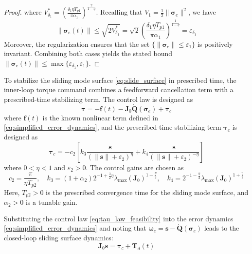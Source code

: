 \documentclass[journal]{new-aiaa}
\begin{document}
\begin{proof}
where $V^*_{\delta_1} = \left( \frac{\delta_1 \eta T_{p1}}{\pi \alpha_1} \right)^{\frac{2}{1 - \eta}}$.
Recalling that $V_1 = \tfrac{1}{2} \|\boldsymbol{\sigma}_e\|^2$, we have 
\begin{equation}
    \|\boldsymbol{\sigma}_e(t)\| \le \sqrt{2 V^*_{\delta_1}} = \sqrt{2} \left( \frac{\delta_1 \eta T_{p1}}{\pi \alpha_1} \right)^{\frac{1}{1 - \eta}} = \varepsilon_{\delta_1}
\end{equation}
Moreover, 
the regularization ensures that the set $\{ \|\boldsymbol{\sigma}_e\| \le \varepsilon_1 \}$ is positively invariant. 
Combining both cases yields the stated bound $\|\boldsymbol{\sigma}_e(t)\| \le \max\{\varepsilon_{\delta_1}, \varepsilon_1\}$.
\end{proof}

To stabilize the sliding mode surface \eqref{eq:slide_surface} in prescribed time, the inner-loop torque command combines a feedforward cancellation term with a prescribed-time stabilizing term.
The control law is designed as
\begin{equation}
\boldsymbol{\tau} = -\boldsymbol{f}(t) - \boldsymbol{J}_0\dot{\boldsymbol{Q}}(\boldsymbol{\sigma}_e) + \boldsymbol{\tau}_c
\label{eq:tau_law_feasibility}
\end{equation}
where $\boldsymbol{f}(t)$ is the known nonlinear term defined in \eqref{eq:simplified_error_dynamics}, and the prescribed-time stabilizing term $\boldsymbol{\tau}_c$ is designed as
\begin{equation}
\boldsymbol{\tau}_c = -c_2 \left[
k_3 \frac{\boldsymbol{s}}{(\|\boldsymbol{s}\| + \varepsilon_2)^\eta}
+ k_4 \frac{\boldsymbol{s}}{(\|\boldsymbol{s}\| + \varepsilon_2)^{-\eta}}
\right]
\end{equation}
where $0 < \eta < 1$ and $\varepsilon_2 > 0$. The control gains are chosen as
\[
c_2 = \frac{\pi}{\eta T_{p2}}, \quad
k_3 = (1 + \alpha_2) 2^{-1 + \frac{3}{2}\eta} \lambda_{\max}(\boldsymbol{J}_0)^{1 - \frac{\eta}{2}}, \quad
k_4 = 2^{-1 - \frac{\eta}{2}} \lambda_{\max}(\boldsymbol{J}_0)^{1 + \frac{\eta}{2}}
\]
Here, $T_{p2} > 0$ is the prescribed convergence time for the sliding mode surface, and $\alpha_2 > 0$ is a tunable gain.

Substituting the control law \eqref{eq:tau_law_feasibility} into the error dynamics \eqref{eq:simplified_error_dynamics} and noting that $\dot{\boldsymbol{\omega}}_e = \dot{\boldsymbol{s}} - \dot{\boldsymbol{Q}}(\boldsymbol{\sigma}_e)$ leads to the closed-loop sliding surface dynamics:
\begin{equation}
\boldsymbol{J}_0 \dot{\boldsymbol{s}} = \boldsymbol{\tau}_c + \boldsymbol{T}_d(t)
\label{eqL:closed_dynamics_s}
\end{equation}
\end{document}
